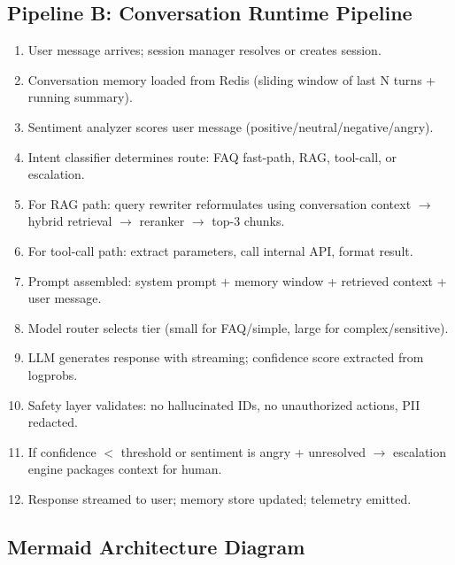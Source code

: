 \subsection*{Pipeline B: Conversation Runtime Pipeline}

\begin{enumerate}
  \item User message arrives; session manager resolves or creates session.
  \item Conversation memory loaded from Redis (sliding window of last N turns + running summary).
  \item Sentiment analyzer scores user message (positive/neutral/negative/angry).
  \item Intent classifier determines route: FAQ fast-path, RAG, tool-call, or escalation.
  \item For RAG path: query rewriter reformulates using conversation context $\rightarrow$ hybrid retrieval $\rightarrow$ reranker $\rightarrow$ top-3 chunks.
  \item For tool-call path: extract parameters, call internal API, format result.
  \item Prompt assembled: system prompt + memory window + retrieved context + user message.
  \item Model router selects tier (small for FAQ/simple, large for complex/sensitive).
  \item LLM generates response with streaming; confidence score extracted from logprobs.
  \item Safety layer validates: no hallucinated IDs, no unauthorized actions, PII redacted.
  \item If confidence $<$ threshold or sentiment is angry + unresolved $\rightarrow$ escalation engine packages context for human.
  \item Response streamed to user; memory store updated; telemetry emitted.
\end{enumerate}

\subsection*{Mermaid Architecture Diagram}

